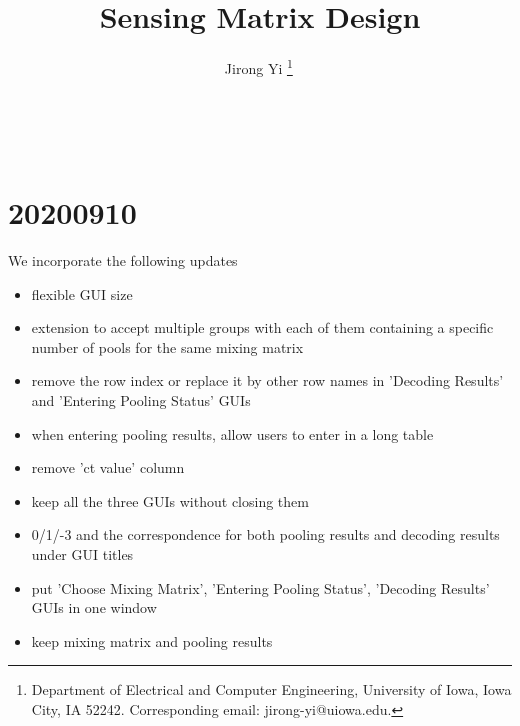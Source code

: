 \documentclass{article}
\theoremstyle{remark}
\begin{document}
\title{Sensing Matrix Design}

\author{
Jirong Yi {\footnote{
Department of Electrical and Computer Engineering, University of Iowa, Iowa City, IA 52242. Corresponding email: jirong-yi@uiowa.edu.}}\,}\,



\maketitle



\section{20200910}\label{20200910}

We incorporate the following updates
\begin{itemize}
	\item flexible GUI size
	
	\item extension to accept multiple groups with each of them containing a specific number of pools for the same mixing matrix
	
	\item remove the row index or replace it by other row names in 'Decoding Results' and 'Entering Pooling Status' GUIs
	
	\item when entering pooling results, allow users to enter in a long table
	
	\item remove 'ct value' column
	
	\item keep all the three GUIs without closing them
	
	\item 0/1/-3 and the correspondence for both pooling results and decoding results under GUI titles
	
	\item put 'Choose Mixing Matrix', 'Entering Pooling Status', 'Decoding Results' GUIs in one window
	
	\item keep mixing matrix and pooling results
	 
	
	
	
\end{itemize}
\end{document}
